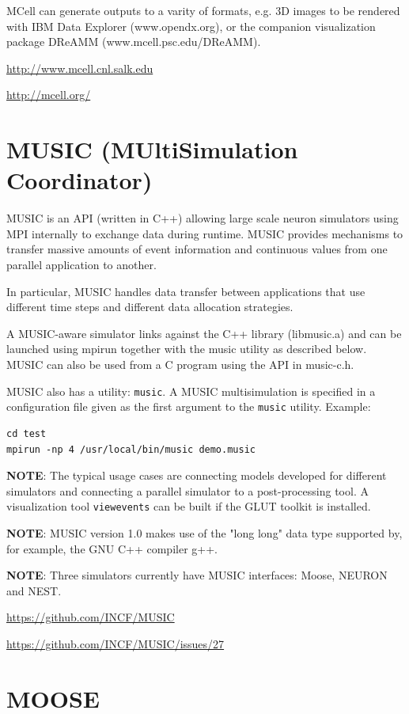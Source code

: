 MCell can generate outputs to a varity of formats, e.g. 3D images to be rendered
with IBM Data Explorer (www.opendx.org), or the companion visualization package
DReAMM (www.mcell.psc.edu/DReAMM).

\url{http://www.mcell.cnl.salk.edu}

\url{http://mcell.org/}

\section{MUSIC (MUltiSimulation Coordinator)}
\label{sec:MUSIC-Multisimulation-coordinator}

MUSIC is an API (written in C++) allowing large scale neuron simulators using
MPI internally to exchange data during runtime.  MUSIC provides mechanisms to
transfer massive amounts of event information and continuous values from one
parallel application to another.

In particular, MUSIC handles data transfer between applications that use
different time steps and different data allocation strategies.

A MUSIC-aware simulator links against the C++ library (libmusic.a) and can be
launched using mpirun together with the music utility as described below.  MUSIC
can also be used from a C program using the API in music-c.h.

MUSIC also has a utility: \verb!music!. 
A MUSIC multisimulation is specified in a configuration file given as
the first argument to the \verb!music! utility. Example:
\begin{verbatim}
cd test
mpirun -np 4 /usr/local/bin/music demo.music
\end{verbatim}


{\bf NOTE}: The typical usage cases are connecting models developed for
different simulators and connecting a parallel simulator to a post-processing
tool. A visualization tool \verb!viewevents! can be built if the GLUT toolkit is
installed.


{\bf NOTE}: MUSIC version 1.0 makes use of the "long long" data type supported
by, for example, the GNU C++ compiler g++.

{\bf NOTE}: Three simulators currently have MUSIC interfaces: Moose, NEURON and
NEST.


\url{https://github.com/INCF/MUSIC}

\url{https://github.com/INCF/MUSIC/issues/27}

\section{MOOSE}
\label{sec:MOOSE}

